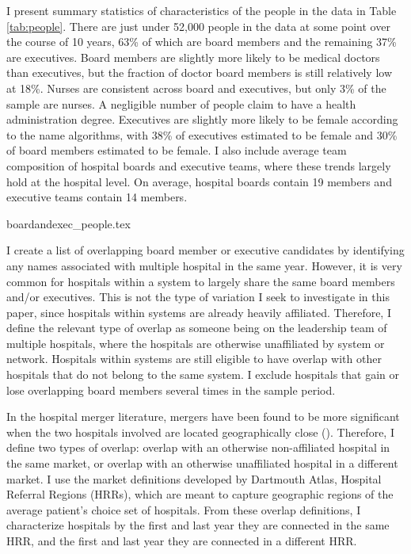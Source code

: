 \documentclass[12pt]{article}
\begin{document}
    I present summary statistics of characteristics of the people in the data in Table \ref{tab:people}. There are just under 52,000 people in the data at some point over the course of 10 years, 63\% of which are board members and the remaining 37\% are executives. Board members are slightly more likely to be medical doctors than executives, but the fraction of doctor board members is still relatively low at 18\%. Nurses are consistent across board and executives, but only 3\% of the sample are nurses. A negligible number of people claim to have a health administration degree. Executives are slightly more likely to be female according to the name algorithms, with 38\% of executives estimated to be female and 30\% of board members estimated to be female. I also include average team composition of hospital boards and executive teams, where these trends largely hold at the hospital level. On average, hospital boards contain 19 members and executive teams contain 14 members. 

    {boardandexec_people.tex}

    I create a list of overlapping board member or executive candidates by identifying any names associated with multiple hospital in the same year. However, it is very common for hospitals within a system to largely share the same board members and/or executives. This is not the type of variation I seek to investigate in this paper, since hospitals within systems are already heavily affiliated. Therefore, I define the relevant type of overlap as someone being on the leadership team of multiple hospitals, where the hospitals are otherwise unaffiliated by system or network. Hospitals within systems are still eligible to have overlap with other hospitals that do not belong to the same system. I exclude hospitals that gain or lose overlapping board members several times in the sample period. 
    
    In the hospital merger literature, mergers have been found to be more significant when the two hospitals involved are located geographically close (\cite{cooper2019price}). Therefore, I define two types of overlap: overlap with an otherwise non-affiliated hospital in the same market, or overlap with an otherwise unaffiliated hospital in a different market. I use the market definitions developed by Dartmouth Atlas, Hospital Referral Regions (HRRs), which are meant to capture geographic regions of the average patient's choice set of hospitals. From these overlap definitions, I characterize hospitals by the first and last year they are connected in the same HRR, and the first and last year they are connected in a different HRR. 
\end{document}
